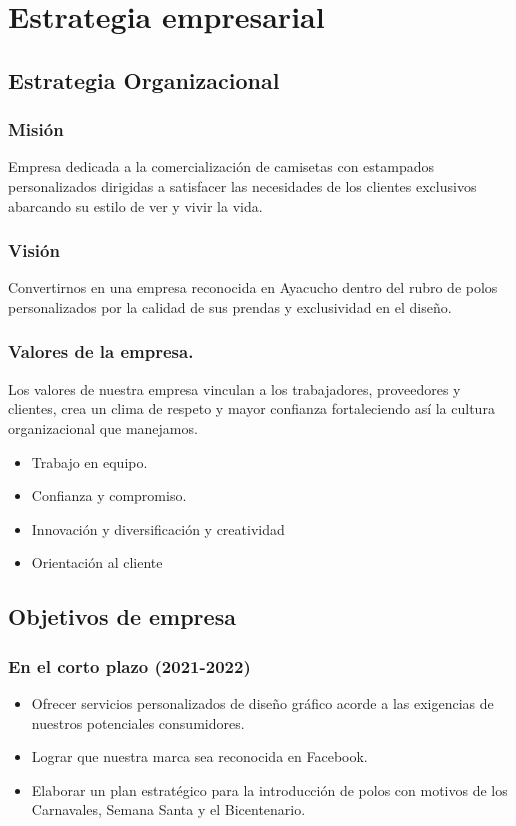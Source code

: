 \documentclass[a4paper,openright,12pt]{book}
\begin{document}
\newpage

\section{Estrategia empresarial}

\subsection{Estrategia Organizacional}

\subsubsection{Misión}
Empresa dedicada a la comercialización de camisetas con estampados personalizados dirigidas a satisfacer las necesidades de los clientes exclusivos abarcando su estilo de ver y vivir la vida.
\subsubsection{Visión}

Convertirnos en una empresa reconocida en Ayacucho dentro del rubro de polos personalizados por la calidad de sus prendas y exclusividad en el diseño.
\subsubsection{Valores de la empresa.}

Los valores de nuestra empresa vinculan a los trabajadores, proveedores y clientes, crea un clima de respeto y mayor confianza fortaleciendo así la cultura organizacional que manejamos.
\begin{itemize}
\item Trabajo en equipo.
\item Confianza y compromiso.
\item Innovación y diversificación y creatividad
\item Orientación al cliente
\end{itemize}

\subsection{Objetivos de empresa}

\subsubsection{En el corto plazo (2021-2022)}
\begin{itemize}
\item Ofrecer servicios personalizados de diseño gráfico acorde a las exigencias de nuestros potenciales consumidores.
\item Lograr que nuestra marca sea reconocida en Facebook.
\item Elaborar un plan estratégico para la introducción de polos con motivos de los Carnavales, Semana Santa y el Bicentenario.
\end{itemize}
\end{document}
